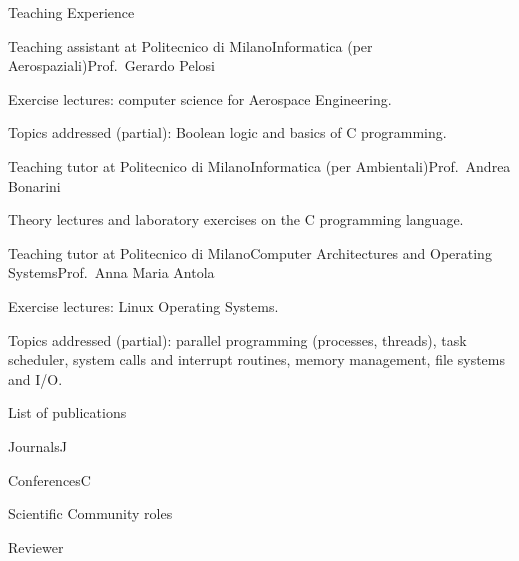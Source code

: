 \documentclass[
	a4paper, %
	10pt, %
]{tresume} %
\begin{document}
\begin{tSection}{Teaching Experience}
\begin{tSubsection}{Teaching assistant at Politecnico di Milano}{}{Informatica (per Aerospaziali)}{Prof.\ Gerardo Pelosi}
  \item Exercise lectures: computer science for Aerospace Engineering.
  \item Topics addressed (partial): Boolean logic and basics of C programming.
  \end{tSubsection}
  \begin{tSubsection}{Teaching tutor at Politecnico di Milano}{}{Informatica (per Ambientali)}{Prof.\ Andrea Bonarini}
\item Theory lectures and laboratory exercises on the C programming language.
\end{tSubsection}
\begin{tSubsection}{Teaching tutor at Politecnico di Milano}{}{Computer
    Architectures and Operating Systems}{Prof.\ Anna Maria Antola}
\item Exercise lectures: Linux Operating Systems.
\item Topics addressed (partial): parallel programming (processes, threads),
    task scheduler, system calls and interrupt routines, memory management, file
    systems and I/O.
\end{tSubsection}
\end{tSection}
\clearpage
\begin{tSection}{List of publications}
  \begin{tSubPublications}{Journals}{J}
  \item {}
  \end{tSubPublications}
  \begin{tSubPublications}{Conferences}{C}
  \item {}
  \item {}
  \end{tSubPublications}
\end{tSection}
\begin{tSection}{Scientific Community roles}
  \begin{tSubsection}{Reviewer}{}{}{}
  \item {}
  \item {}
  \item {}
  \end{tSubsection}
\end{tSection}
\end{document}
